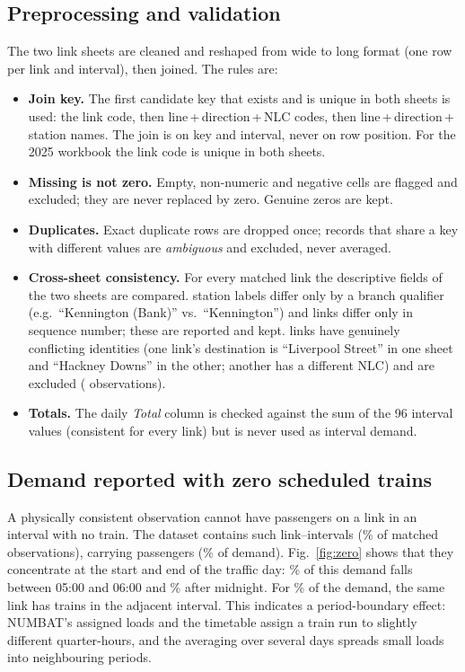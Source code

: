 \documentclass[conference]{IEEEtran}
\begin{document}
\subsection{Preprocessing and validation}\label{sec:prep}
The two link sheets are cleaned and reshaped from wide to long format (one row per link and interval), then joined.
The rules are:
\begin{itemize}
\item \textbf{Join key.} The first candidate key that exists and is unique in both sheets is used: the link code, then
  line\,+\,direction\,+\,NLC codes, then line\,+\,direction\,+\,station names. The join is on key and interval, never
  on row position. For the 2025 workbook the link code is unique in both sheets.
\item \textbf{Missing is not zero.} Empty, non-numeric and negative cells are flagged and excluded; they are never
  replaced by zero. Genuine zeros are kept.
\item \textbf{Duplicates.} Exact duplicate rows are dropped once; records that share a key with different values are
  \emph{ambiguous} and excluded, never averaged.
\item \textbf{Cross-sheet consistency.} For every matched link the descriptive fields of the two sheets are compared.
  \NLabelVariants{} station labels differ only by a branch qualifier (e.g.\ ``Kennington (Bank)'' vs.\ ``Kennington'')
  and \NOrderDiffs{} links differ only in sequence number; these are reported and kept. \NAmbiguousLinks{} links have
  genuinely conflicting identities (one link's destination is ``Liverpool Street'' in one sheet and ``Hackney Downs''
  in the other; another has a different NLC) and are excluded (\NExcludedObs{} observations).
\item \textbf{Totals.} The daily \emph{Total} column is checked against the sum of the 96 interval values (consistent
  for every link) but is never used as interval demand.
\end{itemize}

\subsection{Demand reported with zero scheduled trains}\label{sec:zero}
A physically consistent observation cannot have passengers on a link in an interval with no train. The dataset
contains \ZeroObs{} such link--intervals (\ZeroObsPct\% of matched observations), carrying \ZeroDemand{} passengers
(\ZeroDemandPct\% of demand). Fig.~\ref{fig:zero} shows that they concentrate at the start and end of the traffic day:
\ZeroFirstHourPct\% of this demand falls between 05:00 and 06:00 and \ZeroLatePct\% after midnight. For
\ZeroAdjacentPct\% of the demand, the same link has trains in the adjacent interval. This indicates a period-boundary
effect: NUMBAT's assigned loads and the timetable assign a train run to slightly different quarter-hours, and the
averaging over several days spreads small loads into neighbouring periods.
\end{document}
